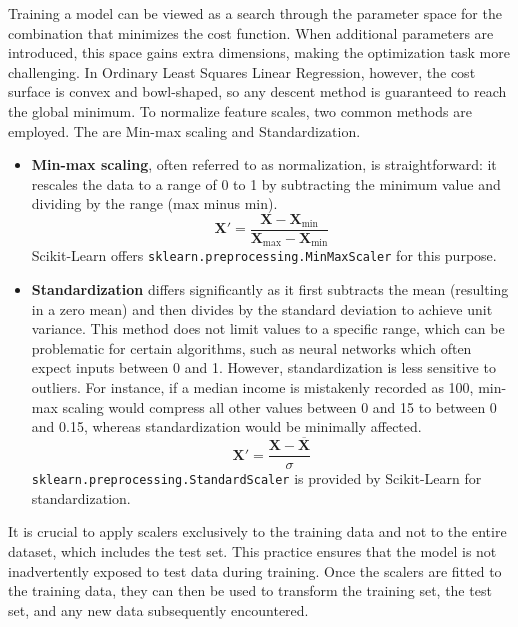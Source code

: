 \documentclass[12pt,letter]{article}
\begin{document}
Training a model can be viewed as a search through the parameter space for the combination that minimizes the cost function. When additional parameters are introduced, this space gains extra dimensions, making the optimization task more challenging. In Ordinary Least Squares Linear Regression, however, the cost surface is convex and bowl-shaped, so any descent method is guaranteed to reach the global minimum. To normalize feature scales, two common methods are employed. The are Min-max scaling and Standardization. 
\begin{itemize}
\item \textbf{Min-max scaling}, often referred to as normalization, is straightforward: it rescales the data to a range of 0 to 1 by subtracting the minimum value and dividing by the range (max minus min).
\begin{equation}
\textbf{X}' = \frac{\textbf{X} - \textbf{X}_\text{min}}{\textbf{X}_\text{max} - \textbf{X}_\text{min}}
\end{equation}
Scikit-Learn offers \texttt{sklearn.preprocessing.MinMaxScaler} for this purpose.
\item \textbf{Standardization} differs significantly as it first subtracts the mean (resulting in a zero mean) and then divides by the standard deviation to achieve unit variance. This method does not limit values to a specific range, which can be problematic for certain algorithms, such as neural networks which often expect inputs between 0 and 1. However, standardization is less sensitive to outliers. For instance, if a median income is mistakenly recorded as 100, min-max scaling would compress all other values between 0 and 15 to between 0 and 0.15, whereas standardization would be minimally affected.
\begin{equation}
\textbf{X}' = \frac{\textbf{X} - \overline{\textbf{X}}}{\sigma}
\end{equation}
\texttt{sklearn.preprocessing.StandardScaler} is provided by Scikit-Learn for standardization.
\end{itemize}

\begin{mdframed}[middlelinewidth=0.5mm]
\begin{center}
\end{center}
It is crucial to apply scalers exclusively to the training data and not to the entire dataset, which includes the test set. This practice ensures that the model is not inadvertently exposed to test data during training. Once the scalers are fitted to the training data, they can then be used to transform the training set, the test set, and any new data subsequently encountered.
\end{mdframed}
\end{document}
